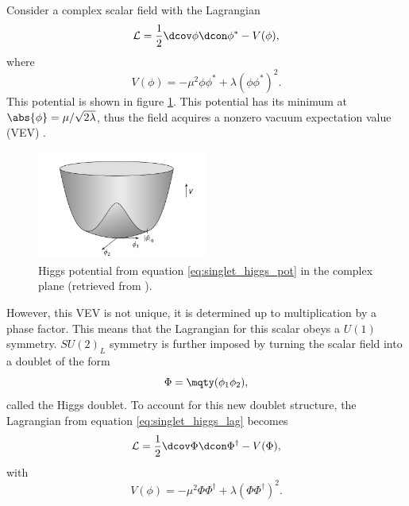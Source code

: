 Consider a complex scalar field with the Lagrangian
\begin{equation}\label{eq:singlet_higgs_lag}
    \mathcal{L} = \frac{1}{2}\dcov \phi \dcon \phi^* - V(\phi),
\end{equation}
where
\begin{equation}\label{eq:singlet_higgs_pot}
    V(\phi) = -\mu^2 \phi\phi^* + \lambda(\phi\phi^*)^2.
\end{equation}
This potential is shown in figure \ref{fig:higgs}. This potential has its minimum at $\abs{\phi} = \mu/\sqrt{2\lambda}$, thus the field acquires a nonzero vacuum expectation value (VEV) \cite{goldberg_standard_2017}. 
\begin{figure}[t]
    \centering
    \includegraphics[width = 0.5\textwidth]{images/higgs-potential.png}
    \caption{Higgs potential from equation \eqref{eq:singlet_higgs_pot} in the complex plane (retrieved from \cite{goldberg_standard_2017}).}
    \label{fig:higgs}
\end{figure}

However, this  VEV is not unique, it is determined up to multiplication by a phase factor. This means that the Lagrangian for this scalar obeys a $U(1)$ symmetry. $SU(2)_L$ symmetry is further imposed by turning the scalar field into a doublet of the form $$\Phi = \mqty(\phi_1 \\ \phi_2),$$ called the Higgs doublet. To account for this new doublet structure, the Lagrangian from equation \eqref{eq:singlet_higgs_lag} becomes
\begin{equation}
    \mathcal{L} = \frac{1}{2}\dcov \Phi \dcon \Phi^\dagger - V(\Phi),
\end{equation}
with
\begin{equation}\label{eq:higgs_pot}
    V(\phi) = -\mu^2 \Phi\Phi^\dagger + \lambda(\Phi\Phi^\dagger)^2.
\end{equation}

